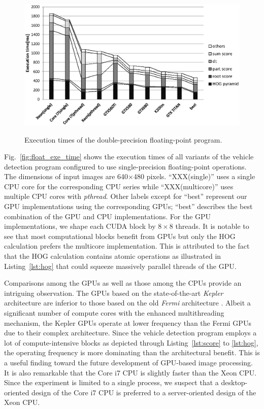 \begin{figure}[t]
 \begin{center}
  \includegraphics[width=\hsize]{fig/double_exe_time.eps}\\
  \caption{Execution times of the double-precision floating-point program.}
  \label{fig:double_exe_time}
 \end{center}
\end{figure}

Fig.~\ref{fig:float_exe_time} shows the execution times of all variants
of the vehicle detection program configured to use single-precision
floating-point operations.
The dimensions of input images are 640$\times$480 pixels.
``XXX(single)'' uses a single CPU core for the corresponding CPU series
while ``XXX(multicore)'' uses multiple CPU cores with \textit{pthread}.
Other labels except for ``best'' represent our GPU implementations using
the corresponding GPUs; ``best'' describes the best combination of the
GPU and CPU implementations.
For the GPU implementations, we shape each CUDA block by $8 \times 8$
threads.
It is notable to see that most computational blocks benefit from GPUs
but only the HOG calculation prefers the multicore implementation.
This is attributed to the fact that the HOG calculation contains atomic
operations as illustrated in Listing~\ref{lst:hog} that could squeeze
massively parallel threads of the GPU.

Comparisons among the GPUs as well as those among the CPUs provide an
intriguing observation.
The GPUs based on the state-of-the-art \textit{Kepler}
architecture \cite{NVIDIA_Kepler} are inferior to those based on the
old \textit{Fermi} architecture \cite{NVIDIA_Fermi}.
Albeit a significant number of compute cores with the enhanced
multithreading mechanism, the Kepler GPUs operate at lower frequency
than the Fermi GPUs due to their complex architecture.
Since the vehicle detection program employs a lot of compute-intensive
blocks as depicted through Listing~\ref{lst:score} to \ref{lst:hog}, the
operating  frequency is more dominating than the architectural benefit.
This is a useful finding toward the future development of GPU-based
image processing.
It is also remarkable that the Core i7 CPU is slightly faster than the
Xeon CPU.
Since the experiment is limited to a single process, we suspect that a
desktop-oriented design of the Core i7 CPU is preferred to a
server-oriented design of the Xeon CPU.

